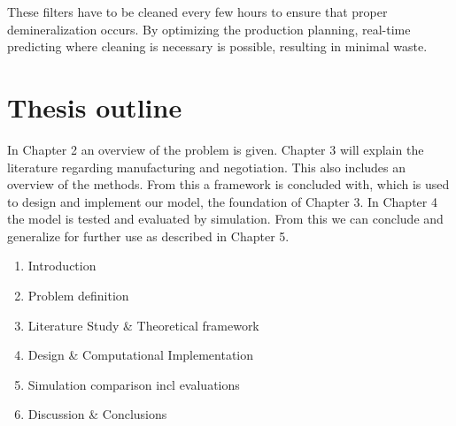 These filters have to be cleaned every few hours to ensure that proper demineralization occurs. By optimizing the production planning, real-time predicting where cleaning is necessary is possible, resulting in minimal waste.

\section{Thesis outline}
In Chapter 2 an overview of the problem is given. Chapter 3 will explain the literature regarding manufacturing and negotiation. This also includes an overview of the methods. From this a framework is concluded with, which is used to design and implement our model, the foundation of Chapter 3. In Chapter 4 the model is tested and evaluated by simulation. From this we can conclude and generalize for further use as described in Chapter 5.
\begin{enumerate}
	
	\item
	Introduction 
	\item
	Problem definition 
	\item
	Literature Study \& Theoretical framework
	\item
	Design \& Computational Implementation
	\item
	Simulation comparison incl evaluations
	\item
	Discussion \& Conclusions
\end{enumerate}

%
%
%
%